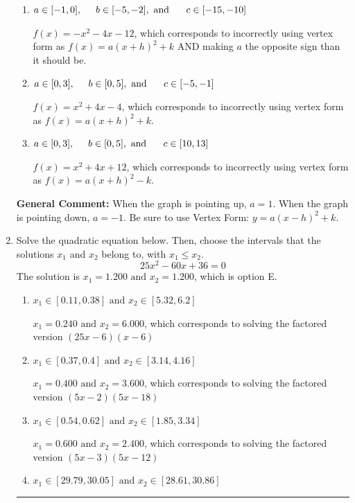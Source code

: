 \documentclass{extbook}[14pt]
\newcommand{\litem}[1]{\item #1

\rule{\textwidth}{0.4pt}}
\begin{document}
\begin{enumerate}
{\begin{enumerate}[label=\Alph*.]
* $f(x)=x^{2} -4 x -4$, which is the correct option.
\item \( a \in [-1, 0], \hspace*{5mm} b \in [-5, -2], \text{ and } \hspace*{5mm} c \in [-15, -10] \)

$f(x)=-x^{2} -4 x -12$, which corresponds to incorrectly using vertex form as $f(x) = a(x+h)^2+k$ AND making $a$ the opposite sign than it should be.
\item \( a \in [0, 3], \hspace*{5mm} b \in [0, 5], \text{ and } \hspace*{5mm} c \in [-5, -1] \)

$f(x)=x^{2} +4 x -4$, which corresponds to incorrectly using vertex form as $f(x) = a(x+h)^2+k$.
\item \( a \in [0, 3], \hspace*{5mm} b \in [0, 5], \text{ and } \hspace*{5mm} c \in [10, 13] \)

$f(x)=x^{2} +4 x + 12$, which corresponds to incorrectly using vertex form as $f(x) = a(x+h)^2 - k$.
\end{enumerate}

\textbf{General Comment:} When the graph is pointing up, $a=1$. When the graph is pointing down, $a=-1$. Be sure to use Vertex Form: $y = a(x-h)^2+k$.
}
\litem{
Solve the quadratic equation below. Then, choose the intervals that the solutions $x_1$ and $x_2$ belong to, with $x_1 \leq x_2$.
\[ 25x^{2} -60 x + 36 = 0 \]The solution is \( x_1 = 1.200 \text{ and } x_2 = 1.200 \), which is option E.\begin{enumerate}[label=\Alph*.]
\item \( x_1 \in [0.11, 0.38] \text{ and } x_2 \in [5.32, 6.2] \)

$x_1 = 0.240 \text{ and } x_2 = 6.000$, which corresponds to solving the factored version $(25x -6)(x -6)$
\item \( x_1 \in [0.37, 0.4] \text{ and } x_2 \in [3.14, 4.16] \)

$x_1 = 0.400 \text{ and } x_2 = 3.600$, which corresponds to solving the factored version $(5x -2)(5x -18)$
\item \( x_1 \in [0.54, 0.62] \text{ and } x_2 \in [1.85, 3.34] \)

$x_1 = 0.600 \text{ and } x_2 = 2.400$, which corresponds to solving the factored version $(5x -3)(5x -12)$
\item \( x_1 \in [29.79, 30.05] \text{ and } x_2 \in [28.61, 30.86] \)


\end{enumerate}}
\end{enumerate}
\end{document}
